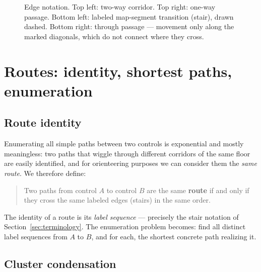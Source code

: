 \documentclass[11pt,a4paper,twocolumn]{article}
\begin{document}
\begin{figure}[h]
\centering
{}
\caption{Edge notation. Top left: two-way corridor. Top right: one-way
passage. Bottom left: labeled map-segment transition (stair), drawn dashed.
Bottom right: through passage --- movement only along the marked diagonals,
which do not connect where they cross.}
\label{fig:notation}
\end{figure}

\section{Routes: identity, shortest paths, enumeration}
\label{sec:routes}

\subsection{Route identity}

Enumerating all simple paths between two controls is exponential and mostly
meaningless: two paths that wiggle through different corridors of the same
floor are easily identified, and for orienteering purposes we can consider them the \emph{same route}. We therefore
define:

\begin{quote}
Two paths from control $A$ to control $B$ are the same \textbf{route} if and
only if they cross the same labeled edges (stairs) in the same order.
\end{quote}

The identity of a route is its \emph{label sequence} --- precisely the stair
notation of Section~\ref{sec:terminology}. The enumeration problem becomes:
find all distinct label sequences from $A$ to $B$, and for each, the shortest
concrete path realizing it.

\subsection{Cluster condensation}
\end{document}
